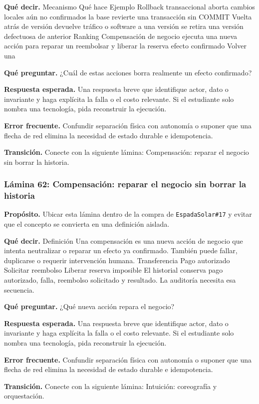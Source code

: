 \documentclass[variant=docente,cover=institutional,mode=screen]{ua-engineering-v6-article}
\begin{document}
\textbf{Qué decir.} Mecanismo Qué hace Ejemplo Rollback transaccional aborta cambios locales aún no confirmados la base revierte una transacción sin COMMIT Vuelta atrás de versión devuelve tráfico o software a una versión se retira una versión defectuosa de anterior Ranking Compensación de negocio ejecuta una nueva acción para reparar un reembolsar y liberar la reserva efecto confirmado Volver una

\textbf{Qué preguntar.} ¿Cuál de estas acciones borra realmente un efecto confirmado?

\textbf{Respuesta esperada.} Una respuesta breve que identifique actor, dato o invariante y haga explícita la falla o el costo relevante. Si el estudiante solo nombra una tecnología, pida reconstruir la ejecución.

\textbf{Error frecuente.} Confundir separación física con autonomía o suponer que una flecha de red elimina la necesidad de estado durable e idempotencia.

\textbf{Transición.} Conecte con la siguiente lámina: Compensación: reparar el negocio sin borrar la historia.

\subsubsection*{Lámina 62: Compensación: reparar el negocio sin borrar la historia}
\textbf{Propósito.} Ubicar esta lámina dentro de la compra de \texttt{EspadaSolar\#17} y evitar que el concepto se convierta en una definición aislada.

\textbf{Qué decir.} Definición Una compensación es una nueva acción de negocio que intenta neutralizar o reparar un efecto ya confirmado. También puede fallar, duplicarse o requerir intervención humana. Transferencia Pago autorizado Solicitar reembolso Liberar reserva imposible El historial conserva pago autorizado, falla, reembolso solicitado y resultado. La auditoría necesita esa secuencia.

\textbf{Qué preguntar.} ¿Qué nueva acción repara el negocio?

\textbf{Respuesta esperada.} Una respuesta breve que identifique actor, dato o invariante y haga explícita la falla o el costo relevante. Si el estudiante solo nombra una tecnología, pida reconstruir la ejecución.

\textbf{Error frecuente.} Confundir separación física con autonomía o suponer que una flecha de red elimina la necesidad de estado durable e idempotencia.

\textbf{Transición.} Conecte con la siguiente lámina: Intuición: coreografía y orquestación.
\end{document}
